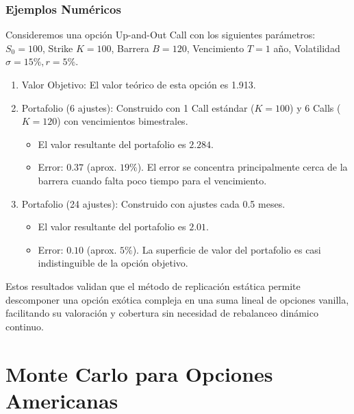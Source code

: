 \subsubsection*{Ejemplos Numéricos} 


Consideremos una opción Up-and-Out Call con los siguientes parámetros: $S_0=100$, Strike $K=100$, Barrera $B=120$, Vencimiento $T=1$ año, Volatilidad $\sigma=15\%, r=5\%$.

\begin{enumerate} 
  \item Valor Objetivo: El valor teórico de esta opción es 1.913. 
  
  \item Portafolio (6 ajustes): Construido con 1 Call estándar ($K=100$) y 6 Calls ($K=120$) con vencimientos bimestrales. 
    \begin{itemize} 
      \item El valor resultante del portafolio es $2.284$.

      \item Error: $0.37$ (aprox. $19\%$). El error se concentra principalmente cerca de la barrera cuando falta poco tiempo para el vencimiento. 
    \end{itemize} 
    
  \item Portafolio (24 ajustes): Construido con ajustes cada 0.5 meses. 
    \begin{itemize} 
      \item El valor resultante del portafolio es $2.01$. 
      
      \item Error: $0.10$ (aprox. $5\%$). La superficie de valor del portafolio es casi indistinguible de la opción objetivo. 
    \end{itemize} 
\end{enumerate}

Estos resultados validan que el método de replicación estática permite descomponer una opción exótica compleja en una suma lineal de opciones vanilla, facilitando su valoración y cobertura sin necesidad de rebalanceo dinámico continuo.

\section{Monte Carlo para Opciones Americanas}
\label{sec:impl_montecarlo}

